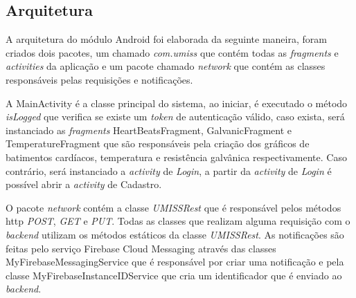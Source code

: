 \subsection{Arquitetura}

A arquitetura do módulo Android foi elaborada da seguinte maneira, foram criados dois pacotes,
um chamado \textit{com.umiss} que contém todas as \textit{fragments} e \textit{activities} da
aplicação e um pacote chamado \textit{network} que contém as classes responsáveis pelas
requisições e notificações.

A MainActivity é a classe principal do sistema, ao iniciar, é executado o método 
\textit{isLogged} que verifica se existe um \textit{token} de autenticação válido, caso
 exista, será instanciado as \textit{fragments} HeartBeatsFragment, GalvanicFragment e 
TemperatureFragment que são responsáveis pela criação dos gráficos de batimentos cardíacos,
temperatura e resistência galvânica respectivamente. Caso contrário, será instanciado a 
\textit{activity} de \textit{Login}, a partir da \textit{activity} de \textit{Login} é
possível abrir a \textit{activity} de Cadastro.

O pacote \textit{network} contém a classe \textit{UMISSRest} que é responsável pelos métodos
http \textit{POST}, \textit{GET} e \textit{PUT}. Todas as classes que realizam alguma 
requisição com o \textit{backend} utilizam os métodos estáticos da classe \textit{UMISSRest}.
As notificações são feitas pelo serviço Firebase Cloud Messaging através das classes
MyFirebaseMessagingService que é responsável por criar uma notificação e pela classe
MyFirebaseInstanceIDService que cria um identificador que é enviado ao \textit{backend}.


